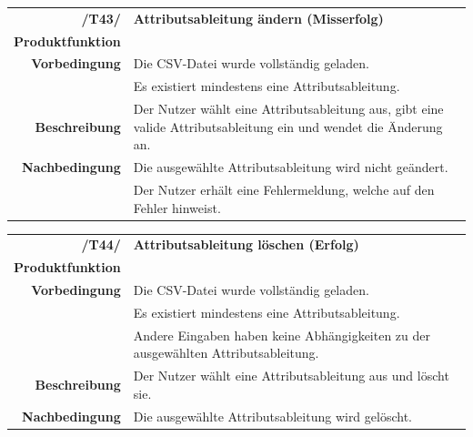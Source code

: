 \documentclass{article}
\begin{document}
\begin{table}[H]
\begin{tabularx}{\textwidth}{rX}
 \vspace{1mm}
\textbf{/T43/}         & \textbf{Attributsableitung ändern (Misserfolg)} \\ \vspace{1mm}
\textbf{Produktfunktion} & \nameref{sec:f:Attributsableitung ändern} \\
\textbf{Vorbedingung}  & Die CSV-Datei wurde vollständig geladen. \\ \vspace{1mm} & Es existiert mindestens eine Attributsableitung.   \\ \vspace{1mm}
\textbf{Beschreibung}  & Der Nutzer wählt eine Attributsableitung aus, gibt eine valide Attributsableitung ein und wendet die Änderung an. \\
\textbf{Nachbedingung} & Die ausgewählte Attributsableitung wird nicht geändert. \\ & Der Nutzer erhält eine Fehlermeldung, welche auf den Fehler hinweist.
\end{tabularx}
\end{table}

\begin{table}[H]
\begin{tabularx}{\textwidth}{rX}
 \vspace{1mm}
\textbf{/T44/}         & \textbf{Attributsableitung löschen (Erfolg)} \\ \vspace{1mm}
\textbf{Produktfunktion} & \nameref{sec:f:Attributsableitung löschen} \\
\textbf{Vorbedingung}  & Die CSV-Datei wurde vollständig geladen. \\ & Es existiert mindestens eine Attributsableitung.  \\ \vspace{1mm} & Andere Eingaben haben keine Abhängigkeiten zu der ausgewählten Attributsableitung. \\ \vspace{1mm}
\textbf{Beschreibung}  & Der Nutzer wählt eine Attributsableitung aus und löscht sie. \\
\textbf{Nachbedingung} & Die ausgewählte Attributsableitung wird gelöscht.
\end{tabularx}
\end{table}
\end{document}
